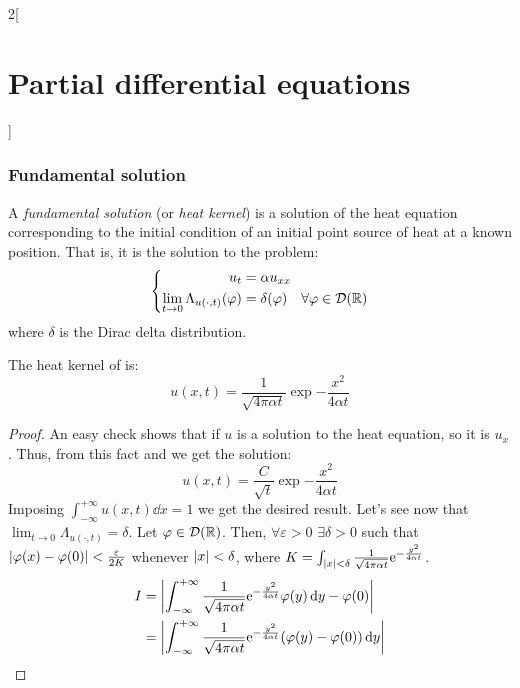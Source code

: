 \documentclass[../../../main_math.tex]{subfiles}
\begin{document}
\begin{multicols}{2}[\section{Partial differential equations}]
  \subsubsection{Fundamental solution}
  \begin{definition}
    A \emph{fundamental solution} (or \emph{heat kernel}) is a solution of the heat equation corresponding to the initial condition of an initial point source of heat at a known position. That is, it is the solution to the problem:
    \begin{equation}\label{PDE:fundamental}
      \left\{
      \begin{aligned}
        u_{t}                                       & =\alpha u_{xx}                                          \\
        \lim_{t\to 0} \Lambda_{u(\cdot,t)}(\varphi) & = \delta(\varphi)\quad\forall\varphi\in\mathcal{D}(\mathbb{R})
      \end{aligned}
      \right.
    \end{equation}
    where $\delta$ is the Dirac delta distribution.
  \end{definition}
  \begin{theorem}\label{PDE:heatkernelprop}
    The heat kernel of  is:
    \begin{equation}\label{PDE:heatkernel}
      u(x,t)=\frac{1}{\sqrt{4\pi\alpha t}}\exp{-\frac{x^2}{4\alpha t}}
    \end{equation}
  \end{theorem}
  \begin{proof}
    An easy check shows that if $u$ is a solution to the heat equation, so it is $u_x$. Thus, from this fact and  we get the solution:
    $$u(x,t)=\frac{C}{\sqrt{t}}\exp{-\frac{x^2}{4\alpha t}}$$
    Imposing $\int_{-\infty}^{+\infty}u(x,t)\dd{x}=1$ we get the desired result. Let's see now that $\displaystyle\lim_{t\to 0} \Lambda_{u(\cdot,t)} =\delta$. Let $\varphi\in\mathcal{D}(\mathbb{R})$. Then, $\forall \varepsilon>0$ $\exists\delta>0$ such that $\abs{\varphi(x)-\varphi(0)}<\frac{\varepsilon}{2K}$ whenever $\abs{x}<\delta$, where $K=\int_{\abs{x}<\delta}\frac{1}{\sqrt{4\pi\alpha t}}\mathrm{e}^{-\frac{y^2}{4\alpha t}}$.
    \begin{align*}
      I & =\abs{\int_{-\infty}^{+\infty}\frac{1}{\sqrt{4\pi\alpha t}}\exp{-\frac{y^2}{4\alpha t}}\varphi(y)\dd{y}-\varphi(0)}    \\
        & = \abs{\int_{-\infty}^{+\infty}\frac{1}{\sqrt{4\pi\alpha t}}\exp{-\frac{y^2}{4\alpha t}}(\varphi(y)-\varphi(0))\dd{y}} \\

\end{align*}
\end{proof}
\end{multicols}
\end{document}
